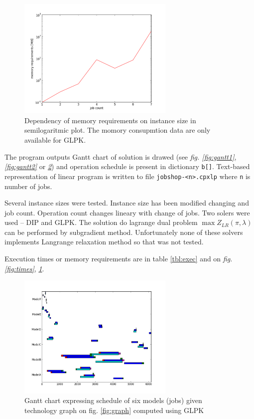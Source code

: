 \documentclass[a4paper,journal,twocolumn]{IEEEtran}
\begin{document}
\begin{figure}[h]%
  \includegraphics[width=75mm]{memory}
  \centering 
  \caption{Dependency of memory requirements on instance size in semilogaritmic plot. The momory consupmtion data are only available for GLPK.}
  \label{fig:memory}
\end{figure}

The program outputs
Gantt chart of solution is drawed (see \emph{fig. \ref{fig:gantt1}}, \emph{\ref{fig:gantt2}} or \emph{\ref{fig:gantt}})
and operation schedule is present in dictionary \texttt{b[]}.
Text-based representation of linear program is written to file \texttt{jobshop-<n>.cpxlp} where \texttt{n} is number of jobs.


Several instance sizes were tested. Instance size has been modified changing and job count. Operation count changes lineary with change of jobs.
Two solers were used -- DIP and GLPK.
The solution do lagrange dual problem $\max Z_{LR}(\pi,\lambda)$ can be performed by subgradient method. 
Unfortunately none of these solvers implements Langrange relaxation method so that was not tested.

Execution times or memory requirements are in table \ref{tbl:exec} and on \emph{fig. \ref{fig:times}}, \emph{\ref{fig:memory}}.

\begin{figure}[h]%
  \includegraphics[width=75mm]{gantt}
  \centering 
  \caption{Gantt chart expressing schedule of six models (jobs) given  technology graph on fig. \ref{fig:graph} computed using GLPK }
  \label{fig:gantt}
\end{figure}
\end{document}
